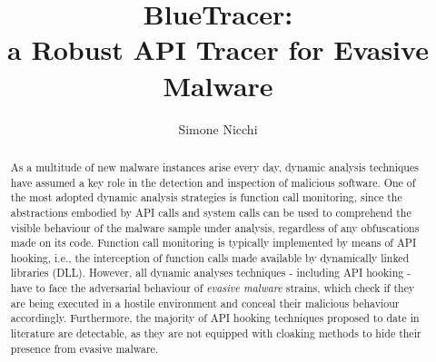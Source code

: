 \documentclass[LaM,english,noexaminfo,oneside]{sapthesis} %
\title{BlueTracer: \\ a Robust API Tracer for Evasive Malware}
\author{Simone Nicchi}
\begin{document}
\frontmatter
\maketitle
\dedication{Ai miei genitori, che non hanno mai smesso di supportarmi}

\begingroup
\clearpage%
\let\clearpage\relax%
\vspace*{-2cm}%


\begin{abstract}

\iffalse     
With thousands of new malware samples surfacing every day, dy-
namic analysis techniques play a fundamental role in the automatic
characterization and detection of malicious behaviors that under-
mine the security of computing systems. And yet, often new threats
emerge that defeat automatic analysis, requiring them to be manu-
ally dissected by expert analysts. A significant fraction of strains
adopt however evasion techniques that hide their malicious behav-
ior if they are under the magnifying glass of an analyst, hindering
the analysis. We propose a methodology for hardening automatic
dynamic analysis techniques to make them more robust against
evasive malware. We build on binary instrumentation and we show
that more than 100 different anti-evasion techniques can be imple-
mented in terms of a minimal core of primitives to withstand com-
mon evasive behaviors. We discuss an embodiment of our approach
in the Pin dynamic binary instrumentation framework showing
how to construct a customizable stealthy sandbox that supports
remote debugging and dynamic taint analysis. We evaluate our
tool on a set of highly evasive malware samples and show how
taint analysis can help analysts to identify new evasive techniques;
countermeasures can then be incorporated into the analysis system
as part of a human-assisted feedback loop mechanism.
\fi

\vspace*{-0.3cm}

As a multitude of new malware instances arise every day, dynamic analysis techniques have assumed a key role in the detection and inspection of malicious software. One of the most adopted dynamic analysis strategies is function call monitoring, since the abstractions embodied by API calls and system calls can be used to comprehend the visible behaviour of the malware sample under analysis, regardless of any obfuscations made on its code. Function call monitoring is typically implemented by means of API hooking, i.e., the interception of function calls made available by dynamically linked libraries (DLL). However, all dynamic analyses techniques - including API hooking - have to face the adversarial behaviour of \textit{evasive malware} strains, which check if they are being executed in a hostile environment and conceal their malicious behaviour accordingly. Furthermore, the majority of API hooking techniques proposed to date in literature are detectable, as they are not equipped with cloaking methods to hide their presence from evasive malware.


\end{abstract}
\end{document}
